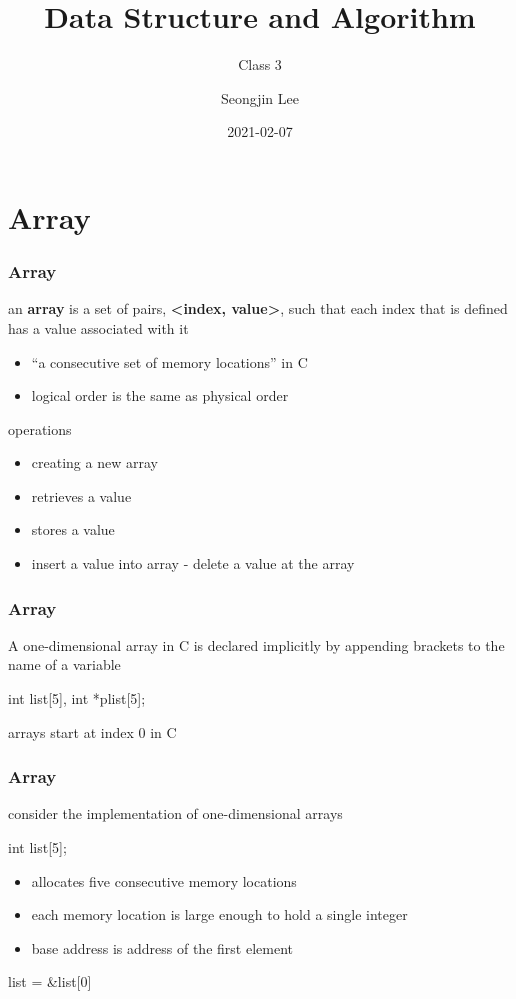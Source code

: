 \documentclass[newPxFont,sthlmFooter,nooffset]{beamer}
\title{Data Structure and Algorithm}
\subtitle{Class 3}
\author[SJL]{Seongjin Lee}
\institute{\href{mailto:insight@gnu.ac.kr}{insight@gnu.ac.kr}\\\url{http://resourceful.github.io}\\Systems Research Lab.\\GNU}
\date{2021-02-07}
\begin{document}
\frame[plain,t]{\titlepage} 



\section{Array} 
\begin{frame}[t]
  \frametitle{Array}
an \textbf{array} is a set of pairs, \textbf{<index, value>}, such that each index that is defined has a value associated with it
\begin{itemize}
\item  ``a consecutive set of memory locations'' in C
\item  logical order is the same as physical order
\end{itemize}

operations
\begin{itemize}
\item creating a new array
\item retrieves a value
\item stores a value
\item insert a value into array - delete a value at the array
\end{itemize}

\end{frame}

\begin{frame}[t, fragile]
  \frametitle{Array}
A one-dimensional array in C is declared implicitly by appending brackets to the name of a variable

\begin{codedef}
  int list[5], int *plist[5];
\end{codedef}

arrays start at index 0 in C  
\end{frame}

\begin{frame}[t, fragile]
  \frametitle{Array}
consider the implementation of one-dimensional arrays

\begin{codedefnb}
int list[5];
\end{codedefnb}

\begin{itemize}
\item allocates five consecutive memory locations
\item each memory location is large enough to hold a single integer
\item base address is address of the first element
\end{itemize}

\begin{codedefnb}
list = &list[0]
\end{codedefnb}

\end{frame}
\end{document}
